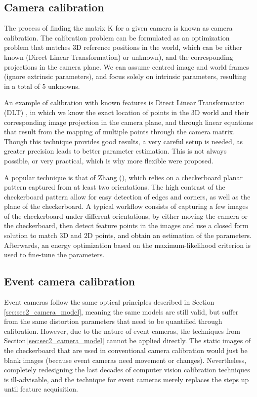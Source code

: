 \subsection{Camera calibration}
\label{sec:sec2_camera_calibration}

The process of finding the matrix K for a given camera is known as camera calibration. The calibration problem can be formulated as an optimization problem that matches 3D reference positions in the world, which can be either known (Direct Linear Transformation) or unknown), and the corresponding projections in the camera plane. We can assume centred image and world frames (ignore extrinsic parameters), and focus solely on intrinsic parameters, resulting in a total of 5 unknowns.

An example of calibration with known features is Direct Linear Transformation (DLT) \cite{tsai1987versatile}, in which we know the exact location of points in the 3D world and their corresponding image projection in the camera plane, and through linear equations that result from the mapping of multiple points through the camera matrix. Though this technique provides good results, a very careful setup is needed, as greater precision leads to better parameter estimation. This is not always possible, or very practical, which is why more flexible were proposed.

A popular technique is that of Zhang (\cite{zhang2000flexible}), which relies on a checkerboard planar pattern captured from at least two orientations. The high contrast of the checkerboard pattern allow for easy detection of edges and corners, as well as the plane of the checkerboard. A typical workflow consists of capturing a few images of the checkerboard under different orientations, by either moving the camera or the checkerboard, then detect feature points in the images and use a closed form solution to match 3D and 2D points, and obtain an estimation of the parameters. Afterwards, an energy optimization based on the maximum-likelihood criterion is used to fine-tune the parameters. 

\subsection{Event camera calibration}

Event cameras follow the same optical principles described in Section\,\ref{sec:sec2_camera_model}, meaning the same models are still valid, but suffer from the same distortion parameters that need to be quantified through calibration. However, due to the nature of event cameras, the techniques from Section\,\ref{sec:sec2_camera_model} cannot be applied directly. The static images of the checkerboard that are used in conventional camera calibration would just be blank images (because event cameras need movement or changes). Nevertheless, completely redesigning the last decades of computer vision calibration techniques is ill-advisable, and the technique for event cameras merely replaces the steps up until feature acquisition.

